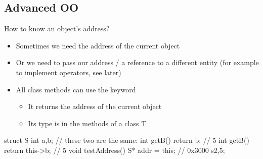 \subsection[advOO]{Advanced OO}

\begin{frame}[fragile]
  \begin{block}{How to know an object's address?}
    \begin{itemize}
    \item Sometimes we need the address of the current object
    \item Or we need to pass our address / a reference to a different entity
      (for example to implement operators, see later)
    \item All class methods can use the keyword 
      \begin{itemize}
        \item It returns the address of the current object
        \item Its type is  in the methods of a class {\ttfamily T}
      \end{itemize}
    \end{itemize}
  \end{block}
  \begin{minipage}{0.7\textwidth}
  \begin{cppcode}
    struct S {
      int a,b;
      // these two are the same:
      int getB() { return b; }       // 5
      int getB() { return this->b; } // 5
      void testAddress() {
        S* addr = this; // 0x3000
      }
    } s{2,5};
  \end{cppcode}
  \end{minipage}%
  \hfil%
  \begin{minipage}{0.3\textwidth}
    \end{minipage}
\end{frame}

